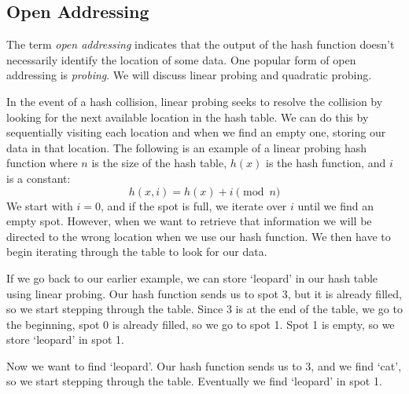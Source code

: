 \subsection*{Open Addressing}
The term \emph{open addressing} indicates that the output of the hash function doesn't necessarily identify the location of some data.
One popular form of open addressing is \emph{probing}.
We will discuss linear probing and quadratic probing.

In the event of a hash collision, linear probing seeks to resolve the collision by looking for the next available location in the hash table.
We can do this by sequentially visiting each location and when we find an empty one, storing our data in that location.
The following is an example of a linear probing hash function where $n$ is the size of the hash table, $h(x)$ is the hash function, and $i$ is a constant:
\begin{equation*}
h(x, i) = h(x) + i \pmod{n}
\end{equation*}
We start with $i = 0$, and if the spot is full, we iterate over $i$ until we find an empty spot.
However, when we want to retrieve that information we will be directed to the wrong location when we use our hash function.
We then have to begin iterating through the table to look for our data.

If we go back to our earlier example, we can store `leopard' in our hash table using linear probing.
Our hash function sends us to spot 3, but it is already filled, so we start stepping through the table.
Since 3 is at the end of the table, we go to the beginning, spot 0 is already filled, so we go to spot 1.
Spot 1 is empty, so we store `leopard' in spot 1.
\begin{center}
\end{center}
Now we want to find `leopard'.
Our hash function sends us to 3, and we find `cat', so we start stepping through the table.
Eventually we find `leopard' in spot 1.

